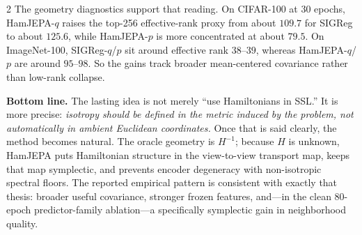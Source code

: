 \documentclass[10pt]{article}
\begin{document}
\begin{multicols}{2}
The geometry diagnostics support that reading. On CIFAR-100 at 30 epochs, HamJEPA-\(q\) raises the top-256 effective-rank proxy from about \(109.7\) for SIGReg to about \(125.6\), while HamJEPA-\(p\) is more concentrated at about \(79.5\). On ImageNet-100, SIGReg-\(q\)/\(p\) sit around effective rank \(38\)–\(39\), whereas HamJEPA-\(q\)/\(p\) are around \(95\)–\(98\). So the gains track broader mean-centered covariance rather than low-rank collapse.

\end{multicols}

\vspace{0pt}
\begin{takebox}
\small
\textbf{Bottom line.} The lasting idea is not merely ``use Hamiltonians in SSL.'' It is more precise: \emph{isotropy should be defined in the metric induced by the problem, not automatically in ambient Euclidean coordinates.} Once that is said clearly, the method becomes natural. The oracle geometry is \(H^{-1}\); because \(H\) is unknown, HamJEPA puts Hamiltonian structure in the view-to-view transport map, keeps that map symplectic, and prevents encoder degeneracy with non-isotropic spectral floors. The reported empirical pattern is consistent with exactly that thesis: broader useful covariance, stronger frozen features, and---in the clean 80-epoch predictor-family ablation---a specifically symplectic gain in neighborhood quality.
\end{takebox}
\end{document}
